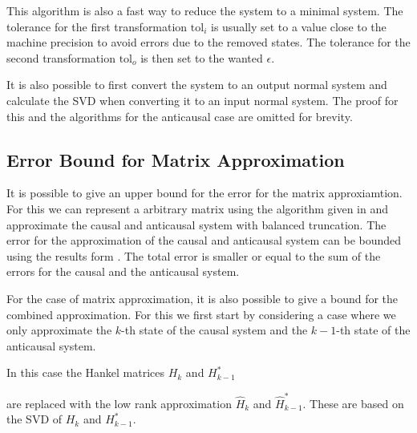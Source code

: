 \documentclass[doctype=mastersthesis,BCOR=15mm,biblatex]{ldvbook}%
\begin{document}
This algorithm is also a fast way to reduce the system to a minimal system.
The tolerance for the first transformation $\text{tol}_i$ is usually set to a value close to the machine precision to avoid errors due to the removed states.
The tolerance for the second transformation $\text{tol}_o$ is then set to the wanted $\epsilon$.
 
It is also possible to first convert the system to an output normal system and calculate the SVD when converting it to an input normal system.
The proof for this and the algorithms for the anticausal case are omitted for brevity.

 
\subsection{Error Bound for Matrix Approximation}

It is possible to give an upper bound for the error for the matrix approxiamtion.
For this we can represent a arbitrary matrix using the algorithm given in \cite{chandrasekaran_fast_2002} and approximate the causal and anticausal system with balanced truncation.
The error for the approximation of the causal and anticausal system can be bounded using the results form \cite{lall_error-bounds_2003}.
The total error is smaller or equal to the sum of the errors for the causal and the anticausal system.

For the case of matrix approximation, it is also possible to give a bound for the combined approximation.
For this we first start by considering a case where we only approximate the $k$-th state of the causal system and the $k-1$-th state of the anticausal system.

In this case the Hankel matrices $H_k$ and $H^*_{k-1}$ 

are replaced with the low rank approximation $\hat{H}_k$ and $\hat{H}^*_{k-1}$.
These are based on the SVD of $H_k$ and $H^*_{k-1}$.
\end{document}
